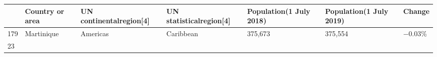 \documentclass[
  11pt,
]{article}
\begin{document}
\begin{longtable}[]{@{}lllllll@{}}
\toprule
\begin{minipage}[b]{0.03\columnwidth}\raggedright
\strut
\end{minipage} & \begin{minipage}[b]{0.11\columnwidth}\raggedright
Country or area\strut
\end{minipage} & \begin{minipage}[b]{0.16\columnwidth}\raggedright
UN continentalregion{[}4{]}\strut
\end{minipage} & \begin{minipage}[b]{0.16\columnwidth}\raggedright
UN statisticalregion{[}4{]}\strut
\end{minipage} & \begin{minipage}[b]{0.16\columnwidth}\raggedright
Population(1 July 2018)\strut
\end{minipage} & \begin{minipage}[b]{0.16\columnwidth}\raggedright
Population(1 July 2019)\strut
\end{minipage} & \begin{minipage}[b]{0.05\columnwidth}\raggedright
Change\strut
\end{minipage}\tabularnewline
\midrule
\endhead
\begin{minipage}[t]{0.03\columnwidth}\raggedright
179\strut
\end{minipage} & \begin{minipage}[t]{0.11\columnwidth}\raggedright
Martinique\strut
\end{minipage} & \begin{minipage}[t]{0.16\columnwidth}\raggedright
Americas\strut
\end{minipage} & \begin{minipage}[t]{0.16\columnwidth}\raggedright
Caribbean\strut
\end{minipage} & \begin{minipage}[t]{0.16\columnwidth}\raggedright
375,673\strut
\end{minipage} & \begin{minipage}[t]{0.16\columnwidth}\raggedright
375,554\strut
\end{minipage} & \begin{minipage}[t]{0.05\columnwidth}\raggedright
−0.03\%\strut
\end{minipage}\tabularnewline
\begin{minipage}[t]{0.03\columnwidth}\raggedright
23\strut
\end{minipage} & \begin{minipage}[t]{0.11\columnwidth}\raggedright

\end{minipage}
\end{longtable}
\end{document}

